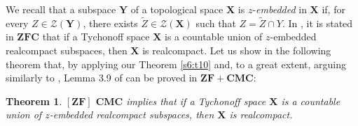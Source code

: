 \documentclass[12pt,twoside,leqno]{article}
\theoremstyle{plain}
\newtheorem{theorem}{Theorem}[section]
\theoremstyle{definition}
\theoremstyle{remark}
\begin{document}
We recall that a subspace $\mathbf{Y}$ of a topological space $\mathbf{X}$ is $z$-\emph{embedded} in $\mathbf{X}$ if, for every $Z\in\mathcal{Z}(\mathbf{Y})$, there exists $\tilde{Z}\in\mathcal{Z}(\mathbf{X})$ such that $Z=\tilde{Z}\cap Y$.  In \cite[Lemma 3.9]{Bl}, it is stated in $\mathbf{ZFC}$ that if a Tychonoff space $\mathbf{X}$ is a countable union of $z$-embedded realcompact subspaces, then $\mathbf{X}$ is realcompact. Let us show in the following theorem that, by applying our Theorem \ref{s6:t10} and, to a great extent, arguing similarly to \cite[the proof of Lemma 3.9]{Bl}, Lemma 3.9 of \cite{Bl} can be proved in $\mathbf{ZF+CMC}$: 

\begin{theorem}
	\label{s6:t12}
	$[\mathbf{ZF}]$ $\mathbf{CMC}$ implies that if a Tychonoff space $\mathbf{X}$ is a countable union of $z$-embedded realcompact subspaces, then $\mathbf{X}$ is realcompact.
\end{theorem}
\end{document}
